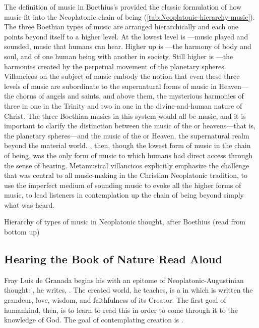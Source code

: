 The definition of music in Boethius's  provided the classic
formulation of how music fit into the Neoplatonic chain of being
(\cref{tab:Neoplatonic-hierarchy-music}).
The three Boethian types of music are arranged hierarchically and each one
points beyond itself to a higher level.
At the lowest level is ---music played and sounded,
music that humans can hear.
Higher up is ---the harmony of body and soul, and of one
human being with another in society.
Still higher is ---the harmonies created by the perpetual
movement of the planetary spheres.
Villancicos on the subject of music embody the notion that even these three
levels of music are subordinate to the supernatural forms of music in
Heaven---the chorus of angels and saints, and above them, the mysterious
harmonies of three in one in the Trinity and two in one in the divine-and-human
nature of Christ.
The three Boethian musics in this system would all be  music,
and it is important to clarify the distinction between the music of the
 or heavens---that is, the planetary spheres---and the
 music of the  or Heaven, the
supernatural realm beyond the material world.
, then, though the lowest form of music in the
chain of being, was the only form of music to which humans had direct access
through the sense of hearing.
Metamusical villancicos explicitly emphasize the challenge that was central to
all music-making in the Christian Neoplatonic tradition, to use the imperfect
medium of sounding music to evoke all the higher forms of music, to lead
listeners in contemplation up the chain of being beyond simply what was heard.

{Hierarchy of types of music in Neoplatonic thought, after Boethius (read from
bottom up)}

\subsection{Hearing the Book of Nature Read Aloud}

Fray Luis de Granada begins his  with an
epitome of Neoplatonic-Augustinian thought: , he writes, .%
    \Autocite[182]{LuisdeGranada:Simbolo}
The created world, he teaches, is a  in which is written
the grandeur, love, wisdom, and faithfulness of its Creator.
The first goal of humankind, then, is to learn to read this  in order to come through it to the knowledge of God. 
The goal of contemplating creation is .%
    \Autocite[184]{LuisdeGranada:Simbolo}

